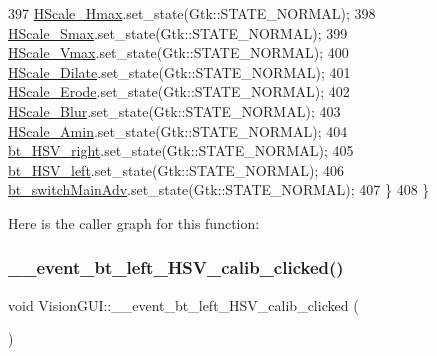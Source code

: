 \begin{DoxyCode}
397         \hyperlink{class_vision_g_u_i_a0b1bb9b8a70bd1f93427f71d0e885313}{HScale\_Hmax}.set\_state(Gtk::STATE\_NORMAL);
398         \hyperlink{class_vision_g_u_i_a147e8499bd7412fdb732103c0754f013}{HScale\_Smax}.set\_state(Gtk::STATE\_NORMAL);
399         \hyperlink{class_vision_g_u_i_ab277d08dcce9e2521b9d4c542be69247}{HScale\_Vmax}.set\_state(Gtk::STATE\_NORMAL);
400         \hyperlink{class_vision_g_u_i_a6a7c757a11a2699e841b6b49fe18d1de}{HScale\_Dilate}.set\_state(Gtk::STATE\_NORMAL);
401         \hyperlink{class_vision_g_u_i_ad4bc77416f4e50fa03a7cc7f64a2d78e}{HScale\_Erode}.set\_state(Gtk::STATE\_NORMAL);
402         \hyperlink{class_vision_g_u_i_a88fa2852521012287ae804404280c57f}{HScale\_Blur}.set\_state(Gtk::STATE\_NORMAL);
403         \hyperlink{class_vision_g_u_i_a72d3a4fe84821ceafeb4293f196aacd7}{HScale\_Amin}.set\_state(Gtk::STATE\_NORMAL);
404         \hyperlink{class_vision_g_u_i_a3b19593890776c5c77e1a39ac3af627d}{bt\_HSV\_right}.set\_state(Gtk::STATE\_NORMAL);
405         \hyperlink{class_vision_g_u_i_a98323988d4a353190a02c827de0cecbf}{bt\_HSV\_left}.set\_state(Gtk::STATE\_NORMAL);
406         \hyperlink{class_vision_g_u_i_a62b2427b20780649d71611c6cdb6a10a}{bt\_switchMainAdv}.set\_state(Gtk::STATE\_NORMAL);
407     \}
408 \}
\end{DoxyCode}
Here is the caller graph for this function\+:
\mbox{\label{class_vision_g_u_i_aa6d54a685b4bddbad91778a442fd7c8e}} 
\subsubsection{\texorpdfstring{\+\_\+\+\_\+event\+\_\+bt\+\_\+left\+\_\+\+H\+S\+V\+\_\+calib\+\_\+clicked()}{\_\_event\_bt\_left\_HSV\_calib\_clicked()}}
{\footnotesize\ttfamily void Vision\+G\+U\+I\+::\+\_\+\+\_\+event\+\_\+bt\+\_\+left\+\_\+\+H\+S\+V\+\_\+calib\+\_\+clicked (\begin{DoxyParamCaption}{ }\end{DoxyParamCaption})\hspace{0.3cm}{\ttfamily [private]}}



